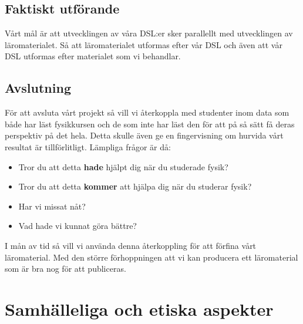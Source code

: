\documentclass[12pt,a4paper]{scrartcl}
\begin{document}
\subsection{Faktiskt utförande}

Vårt mål är att utvecklingen av våra DSL:er sker parallellt med utvecklingen av läromaterialet. Så att läromaterialet utformas efter vår DSL och även att vår DSL utformas efter materialet som vi behandlar.



\subsection{Avslutning}

För att avsluta vårt projekt så vill vi återkoppla med studenter inom data som både har läst fysikkursen och de som inte har läst den för att på så sätt få deras perspektiv på det hela. Detta skulle även ge en fingervisning om hurvida vårt resultat är tillförlitligt. Lämpliga frågor är då:

\begin{itemize}
    \item Tror du att detta \textbf{hade} hjälpt dig när du studerade fysik?
    \item Tror du att detta \textbf{kommer} att hjälpa dig när du studerar fysik?
    \item Har vi missat nåt?
    \item Vad hade vi kunnat göra bättre?
\end{itemize}

I mån av tid så vill vi använda denna återkoppling för att förfina vårt läromaterial. Med den större förhoppningen att vi kan producera ett läromaterial som är bra nog för att publiceras.

\section{Samhälleliga och etiska aspekter}
\end{document}
